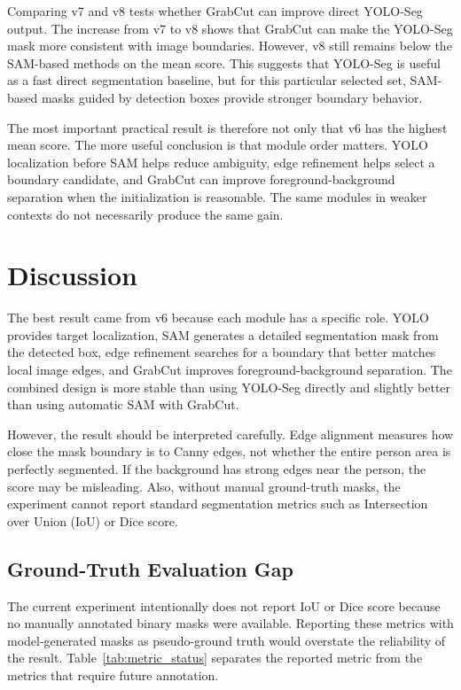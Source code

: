 \documentclass[conference]{IEEEtran}
\begin{document}
Comparing v7 and v8 tests whether GrabCut can improve direct YOLO-Seg output. The increase from v7 to v8 shows that GrabCut can make the YOLO-Seg mask more consistent with image boundaries. However, v8 still remains below the SAM-based methods on the mean score. This suggests that YOLO-Seg is useful as a fast direct segmentation baseline, but for this particular selected set, SAM-based masks guided by detection boxes provide stronger boundary behavior.

The most important practical result is therefore not only that v6 has the highest mean score. The more useful conclusion is that module order matters. YOLO localization before SAM helps reduce ambiguity, edge refinement helps select a boundary candidate, and GrabCut can improve foreground-background separation when the initialization is reasonable. The same modules in weaker contexts do not necessarily produce the same gain.

\section{Discussion}
The best result came from v6 because each module has a specific role. YOLO provides target localization, SAM generates a detailed segmentation mask from the detected box, edge refinement searches for a boundary that better matches local image edges, and GrabCut improves foreground-background separation. The combined design is more stable than using YOLO-Seg directly and slightly better than using automatic SAM with GrabCut.

However, the result should be interpreted carefully. Edge alignment measures how close the mask boundary is to Canny edges, not whether the entire person area is perfectly segmented. If the background has strong edges near the person, the score may be misleading. Also, without manual ground-truth masks, the experiment cannot report standard segmentation metrics such as Intersection over Union (IoU) or Dice score.

\subsection{Ground-Truth Evaluation Gap}
The current experiment intentionally does not report IoU or Dice score because no manually annotated binary masks were available. Reporting these metrics with model-generated masks as pseudo-ground truth would overstate the reliability of the result. Table~\ref{tab:metric_status} separates the reported metric from the metrics that require future annotation.
\end{document}
